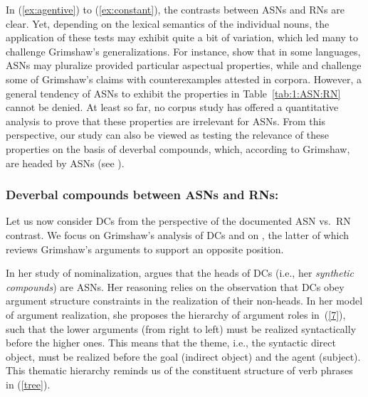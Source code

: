 \documentclass[output=paper]{langsci/langscibook}
\begin{document}
\begin{exe}

\end{exe}

 {In (\ref{ex:agentive}) to (\ref{ex:constant}), the contrasts between ASNs and RNs are clear. Yet, depending on the lexical semantics of the individual nouns, the application of these tests may exhibit quite a bit of variation, which led many to challenge Grimshaw's generalizations. For instance, \cite{alexiadou:iordachioaia:soare:10} show that in some languages, ASNs may pluralize provided particular aspectual properties, while  \cite{grimm:mcnally:13} and \cite{lieber:16} challenge some of Grimshaw's claims with counterexamples attested in corpora. However, a general tendency of ASNs to exhibit the properties in Table~\ref{tab:1:ASN:RN} cannot be denied. At least so far, no corpus study has offered a quantitative analysis to prove that these properties are irrelevant for ASNs. From this perspective, our study can also be viewed as testing the relevance of these properties on the basis of deverbal compounds, which, according to Grimshaw, are headed by ASNs (see ).}


\subsubsection{Deverbal compounds between ASNs and RNs: \cite{grimshaw:90}}\label{sec:prev:lit:DCs}
Let us now consider DCs from the perspective of the documented ASN vs.\ RN contrast. We focus  on Grimshaw's analysis of DCs and on \cite{borer:13}, the latter of which reviews Grimshaw's arguments to support an opposite position.

In her study of nominalization, \cite{grimshaw:90} argues that the heads of DCs (i.e., her \textit{synthetic compounds})  are ASNs.  Her reasoning relies on the observation that DCs obey argument structure constraints in the realization of their non-heads. In her  model of argument realization, she proposes the hierarchy of argument roles in~(\ref{7}), such that the lower arguments (from right to left) must be realized syntactically before the higher ones.
This means that the theme, i.e., the syntactic direct object, must be realized before the goal (indirect object) and the agent (subject).  {This thematic hierarchy reminds us of the constituent structure of verb phrases in (\ref{tree}).}
\end{document}
